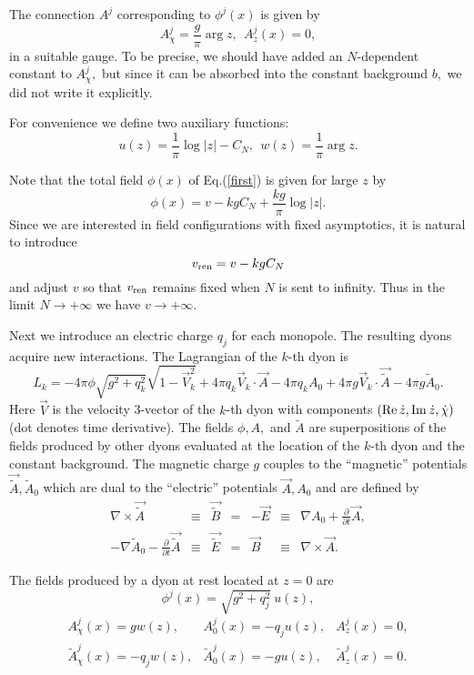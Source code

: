 \documentclass[a4paper,12pt, amsfonts, amssymb]{article}
\newcommand{\ra}{\rightarrow}
\newcommand{\tA}{{\tilde{A}}}
\newcommand{\V}{{\vec{V}}}
\newcommand{\vA}{{\vec{A}}}
\newcommand{\vtA}{{\vec{\tilde{A}}}}
\newcommand{\vr}{v_{{\rm ren}}}
\begin{document}
The connection $A^j$ corresponding
to $\phi^j(x)$ is given by
\begin{equation}
A^j_{\chi}=\frac{g}{\pi}\arg z, \ \ A^j_z(x)=0,
\end{equation}
in a suitable gauge. To be precise, we should have added an $N$-dependent
constant to $A^j_\chi,$ but since it can be absorbed into the constant
background $b,$ we did not write it explicitly.

For convenience we define two auxiliary functions:
$$u(z)=\frac{1}{\pi}\log|z|-C_N, \ \ w(z)=\frac{1}{\pi}\arg z.$$

Note that the total field $\phi(x)$
of Eq.(\ref{first}) is given for large $z$ by
\begin{equation}
\phi(x)=v-kg C_N+\frac{kg}{\pi}\log|z|.
\end{equation}
Since we are interested in field configurations with fixed asymptotics,
it is natural to introduce
$$\vr=v-kg C_N$$
and adjust $v$ so that $\vr$ remains fixed when $N$ is sent to infinity.
Thus in the limit $N\ra +\infty$ we have $v\ra +\infty.$

Next we introduce an electric charge $q_j$ for each monopole. The resulting dyons acquire new interactions.
The Lagrangian of the $k$-th dyon is
\begin{equation}
L_k=-4\pi\phi\sqrt{g^2+q_k^2}\sqrt{1-\V_k^2}+4\pi q_k\V_k\cdot\vA-4\pi
q_k A_0+4\pi g\V_k\cdot\vtA-4 \pi g\tA_0.\nonumber
\end{equation}
Here $\V$ is the velocity 3-vector of the $k$-th dyon with components
$({\rm Re}\,\dot{z}, {\rm Im}\,\dot{z},\dot{\chi})$ (dot denotes time derivative). The fields
$\phi, A,$ and $\tA$ are superpositions of the fields
produced by other dyons evaluated at the location of the $k$-th dyon and
the constant background.
The magnetic charge $g$ couples to the ``magnetic'' potentials $\vtA, \tA_0$
which are dual to the ``electric'' potentials $\vA, A_0$ and are defined by
\begin{equation}
\begin{array}{rcccccl}
\nabla\times\vtA & \equiv &\vec{\tilde{B}} & = & -\vec{E} & \equiv &\nabla A_0+\frac{\partial}{\partial t}{\vA},\\
-\nabla\tA_0-\frac{\partial}{\partial t}\vtA &\equiv
&\vec{\tilde{E}}&=&\vec{B}&\equiv &\nabla\times\vA.
\end{array}
\end{equation}

The fields produced by a dyon at rest located at $z=0$ are
\begin{equation}\label{dyon}
\phi^j(x)=\sqrt{g^2+q_j^2}\ u(z),
\end{equation}
\begin{equation}
\begin{array}{lll}
A^j_{\chi}(x)=g w(z), &A^j_0(x)=-q_j u(z), &A^j_z(x)=0,\\
\tA^j_{\chi}(x)=-q_j w(z), &\tA^j_0(x)=-g u(z), &\tA^j_z(x)=0.
\end{array}
\end{equation}
\end{document}

